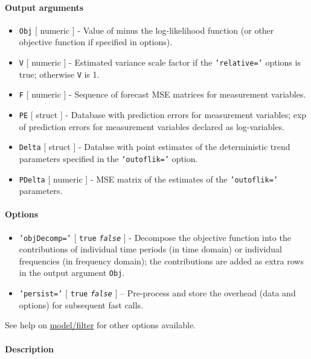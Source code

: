  \paragraph{Output arguments}
 
 \begin{itemize}
 \item
   \texttt{Obj} {[} numeric {]} - Value of minus the log-likelihood
   function (or other objective function if specified in options).
 \item
   \texttt{V} {[} numeric {]} - Estimated variance scale factor if the
   \texttt{'relative='} options is true; otherwise \texttt{V} is 1.
 \item
   \texttt{F} {[} numeric {]} - Sequence of forecast MSE matrices for
   measurement variables.
 \item
   \texttt{PE} {[} struct {]} - Database with prediction errors for
   measurement variables; exp of prediction errors for measurement
   variables declared as log-variables.
 \item
   \texttt{Delta} {[} struct {]} - Databse with point estimates of the
   deterministic trend parameters specified in the \texttt{'outoflik='}
   option.
 \item
   \texttt{PDelta} {[} numeric {]} - MSE matrix of the estimates of the
   \texttt{'outoflik='} parameters.
 \end{itemize}
 
 \paragraph{Options}
 
 \begin{itemize}
 \item
   \texttt{'objDecomp='} {[} \texttt{true} \textbar{}
   \emph{\texttt{false}} {]} - Decompose the objective function into the
   contributions of individual time periods (in time domain) or
   individual frequencies (in frequency domain); the contributions are
   added as extra rows in the output argument \texttt{Obj}.
 \item
   \texttt{'persist='} {[} \texttt{true} \textbar{} \emph{\texttt{false}}
   {]} -- Pre-process and store the overhead (data and options) for
   subsequent fast calls.
 \end{itemize}
 
 See help on \url{model/filter} for other options available.
 
 \paragraph{Description}
 
